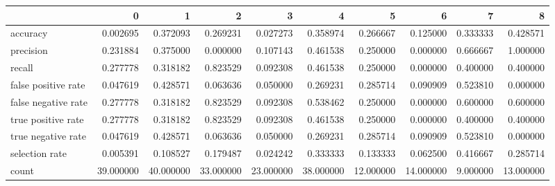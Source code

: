 \begin{tabular}{lrrrrrrrrr}
\toprule
{} &          0 &          1 &          2 &          3 &          4 &          5 &          6 &         7 &          8 \\
\midrule
accuracy            &   0.002695 &   0.372093 &   0.269231 &   0.027273 &   0.358974 &   0.266667 &   0.125000 &  0.333333 &   0.428571 \\
precision           &   0.231884 &   0.375000 &   0.000000 &   0.107143 &   0.461538 &   0.250000 &   0.000000 &  0.666667 &   1.000000 \\
recall              &   0.277778 &   0.318182 &   0.823529 &   0.092308 &   0.461538 &   0.250000 &   0.000000 &  0.400000 &   0.400000 \\
false positive rate &   0.047619 &   0.428571 &   0.063636 &   0.050000 &   0.269231 &   0.285714 &   0.090909 &  0.523810 &   0.000000 \\
false negative rate &   0.277778 &   0.318182 &   0.823529 &   0.092308 &   0.538462 &   0.250000 &   0.000000 &  0.600000 &   0.600000 \\
true positive rate  &   0.277778 &   0.318182 &   0.823529 &   0.092308 &   0.461538 &   0.250000 &   0.000000 &  0.400000 &   0.400000 \\
true negative rate  &   0.047619 &   0.428571 &   0.063636 &   0.050000 &   0.269231 &   0.285714 &   0.090909 &  0.523810 &   0.000000 \\
selection rate      &   0.005391 &   0.108527 &   0.179487 &   0.024242 &   0.333333 &   0.133333 &   0.062500 &  0.416667 &   0.285714 \\
count               &  39.000000 &  40.000000 &  33.000000 &  23.000000 &  38.000000 &  12.000000 &  14.000000 &  9.000000 &  13.000000 \\
\bottomrule
\end{tabular}

